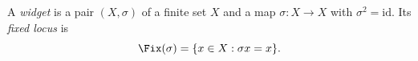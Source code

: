 \begin{definition}[Widget]\label{dm-0001}\label{def:widget}
A \emph{widget} is a pair $(X,\sigma)$ of a finite set $X$ and a map $\sigma\colon X\to X$ with $\sigma^2=\mathrm{id}$. Its \emph{fixed locus} is
\begin{equation}\label{eq:fix}
\Fix(\sigma) = \{x\in X : \sigma x = x\}.
\end{equation}
\end{definition}

